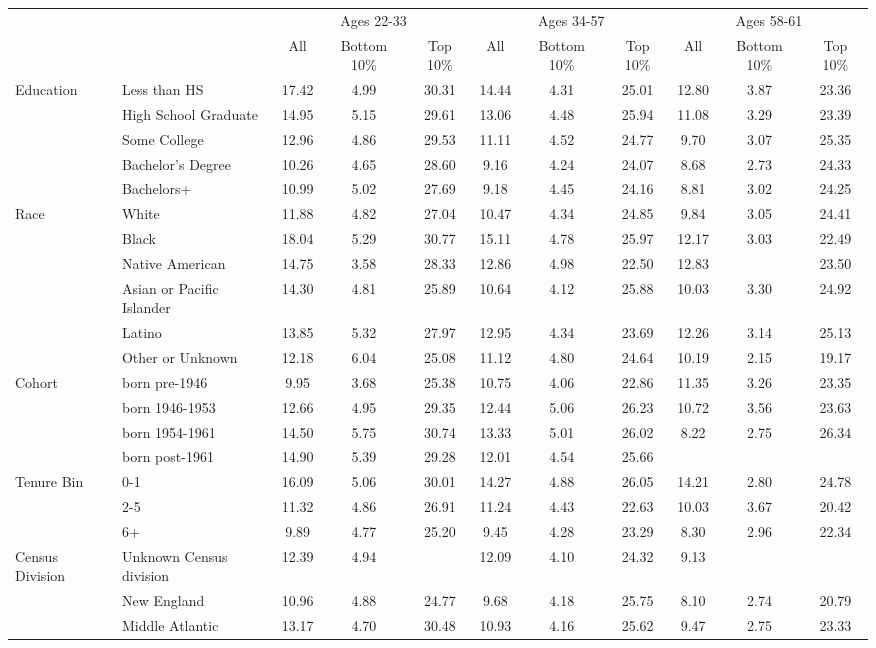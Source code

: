 \begin{tabular}{llccc|ccc|ccc}
\hline\hline
 & & \multicolumn{3}{c|}{Ages 22-33} & \multicolumn{3}{c|}{Ages 34-57} & \multicolumn{3}{c}{Ages 58-61} \\
 & & All & Bottom 10\% & Top 10\% & All & Bottom 10\% & Top 10\% & All & Bottom 10\% & Top 10\% \\
\hline
Education&Less than HS&17.42&4.99&30.31&14.44&4.31&25.01&12.80&3.87&23.36\\
&High School Graduate&14.95&5.15&29.61&13.06&4.48&25.94&11.08&3.29&23.39\\
&Some College&12.96&4.86&29.53&11.11&4.52&24.77&9.70&3.07&25.35\\
&Bachelor's Degree&10.26&4.65&28.60&9.16&4.24&24.07&8.68&2.73&24.33\\
&Bachelors+&10.99&5.02&27.69&9.18&4.45&24.16&8.81&3.02&24.25\\
Race&White&11.88&4.82&27.04&10.47&4.34&24.85&9.84&3.05&24.41\\
&Black&18.04&5.29&30.77&15.11&4.78&25.97&12.17&3.03&22.49\\
&Native American&14.75&3.58&28.33&12.86&4.98&22.50&12.83&&23.50\\
&Asian or Pacific Islander&14.30&4.81&25.89&10.64&4.12&25.88&10.03&3.30&24.92\\
&Latino&13.85&5.32&27.97&12.95&4.34&23.69&12.26&3.14&25.13\\
&Other or Unknown&12.18&6.04&25.08&11.12&4.80&24.64&10.19&2.15&19.17\\
Cohort&born pre-1946&9.95&3.68&25.38&10.75&4.06&22.86&11.35&3.26&23.35\\
&born 1946-1953&12.66&4.95&29.35&12.44&5.06&26.23&10.72&3.56&23.63\\
&born 1954-1961&14.50&5.75&30.74&13.33&5.01&26.02&8.22&2.75&26.34\\
&born post-1961&14.90&5.39&29.28&12.01&4.54&25.66&&&\\
Tenure Bin&0-1&16.09&5.06&30.01&14.27&4.88&26.05&14.21&2.80&24.78\\
&2-5&11.32&4.86&26.91&11.24&4.43&22.63&10.03&3.67&20.42\\
&6+&9.89&4.77&25.20&9.45&4.28&23.29&8.30&2.96&22.34\\
Census Division&Unknown Census division&12.39&4.94&&12.09&4.10&24.32&9.13&&\\
&New England&10.96&4.88&24.77&9.68&4.18&25.75&8.10&2.74&20.79\\
&Middle Atlantic&13.17&4.70&30.48&10.93&4.16&25.62&9.47&2.75&23.33\\

\end{tabular}
